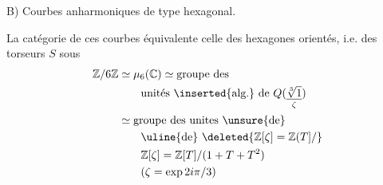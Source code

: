
B) Courbes  anharmoniques de type hexagonal.

La catégorie de ces courbes équivalente  celle des hexagones orientés, i.e. des torseurs $S$ sous
\[
\begin{aligned}
\mathbb Z/6\mathbb Z&\simeq\mu_6(\mathbb C)\simeq
\text{groupe des}\\
&\qquad\text{unités \inserted{alg.} de }Q(\underset{\zeta}{\underline{\sqrt[3]{1}}})\\
&\simeq\text{groupe des unites \unsure{de}}\\
&\qquad\text{\uline{de}}\ \deleted{\mathbb Z[\zeta]=\mathbb Z(T]/}\\
&\qquad\mathbb Z[\zeta]=\mathbb Z[T]/(1+T+T^2)\\
&\qquad(\zeta=\exp 2i\pi/3)
\end{aligned}
\]

